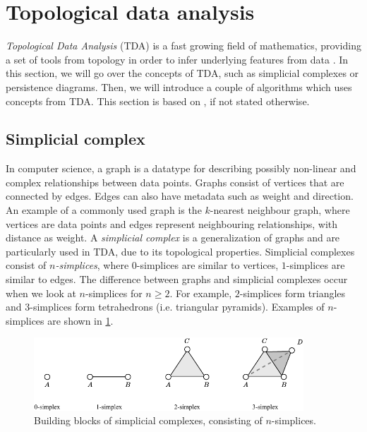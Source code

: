 \section{Topological data analysis}
\label{sec:topological-data-analysis}
\textit{Topological Data Analysis} (TDA) is a fast growing field of mathematics, providing a set of tools from topology in order to infer underlying features from data \cite{chazal2021introduction}. In this section, we will go over the concepts of TDA, such as simplicial complexes or persistence diagrams. Then, we will introduce a couple of algorithms which uses concepts from TDA. This section is based on \cites{Edelsbrunner2010}{chazal2021introduction}, if not stated otherwise.

\subsection{Simplicial complex}
\label{sec:simplicial-complex}
In computer science, a graph is a datatype for describing possibly non-linear and complex relationships between data points. Graphs consist of vertices that are connected by edges. Edges can also have metadata such as weight and direction. An example of a commonly used graph is the $k$-nearest neighbour graph, where vertices are data points and edges represent neighbouring relationships, with distance as weight. A \textit{simplicial complex} is a generalization of graphs and are particularly used in TDA, due to its topological properties. Simplicial complexes consist of \textit{$n$-simplices}, where $0$-simplices are similar to vertices, $1$-simplices are similar to edges. The difference between graphs and simplicial complexes occur when we look at $n$-simplices for $n \geq 2$. For example, $2$-simplices form triangles and $3$-simplices form tetrahedrons (i.e. triangular pyramids). Examples of $n$-simplices are shown in \cref{fig:n-simplices-example}.
\begin{figure}[H]
    \centering
    \includegraphics[width=0.9\textwidth]{thesis/figures/n-simplices_cropped.pdf}
    \caption{Building blocks of simplicial complexes, consisting of $n$-simplices.}
    \label{fig:n-simplices-example}
\end{figure}
